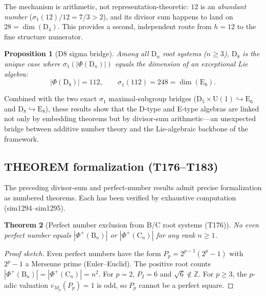 \documentclass[aps,prd,twocolumn,superscriptaddress,floatfix,nofootinbib]{revtex4-2}
\newtheorem{theorem}{Theorem}
\newtheorem{proposition}[theorem]{Proposition}
\theoremstyle{definition}
\theoremstyle{remark}
\begin{document}
\noindent
The mechanism is arithmetic, not representation-theoretic: $12$ is an
\textit{abundant number} ($\sigma_1(12)/12 = 7/3 > 2$), and its divisor
sum happens to land on $28 = \dim(\mathrm{D}_4)$.  This provides a
second, independent route from $h = 12$ to the fine structure numerator.

\begin{proposition}[D8 sigma bridge]
\label{prop:d8-sigma}
Among all $\mathrm{D}_n$ root systems ($n \geq 3$),
$\mathrm{D}_8$ is the unique case where $\sigma_1(|\Phi(\mathrm{D}_n)|)$
equals the dimension of an exceptional Lie algebra:
\begin{equation}
|\Phi(\mathrm{D}_8)| = 112, \qquad
\sigma_1(112) = 248 = \dim(\mathrm{E}_8).
\end{equation}
\end{proposition}

\noindent
Combined with the two exact $\sigma_1$ maximal-subgroup bridges
($\mathrm{D}_5 \times \mathrm{U}(1) \hookrightarrow \mathrm{E}_6$
and $\mathrm{D}_8 \hookrightarrow \mathrm{E}_8$), these results show
that the D-type and E-type algebras are linked not only by embedding
theorems but by divisor-sum arithmetic---an unexpected bridge between
additive number theory and the Lie-algebraic backbone of the framework.

\subsection{THEOREM formalization (T176--T183)}
\label{sec:theorem-formalization}

The preceding divisor-sum and perfect-number results admit precise
formalization as numbered theorems.  Each has been verified by
exhaustive computation (sim1294--sim1295).

\begin{theorem}[Perfect number exclusion from B/C root systems (T176)]
\label{thm:bc-exclusion}
No even perfect number equals $|\Phi^+(\mathrm{B}_n)|$ or
$|\Phi^+(\mathrm{C}_n)|$ for any rank $n \geq 1$.
\end{theorem}

\begin{proof}[Proof sketch]
Even perfect numbers have the form $P_p = 2^{p-1}(2^p - 1)$ with
$2^p - 1$ a Mersenne prime (Euler--Euclid).  The positive root counts
$|\Phi^+(\mathrm{B}_n)| = |\Phi^+(\mathrm{C}_n)| = n^2$.  For $p = 2$,
$P_2 = 6$ and $\sqrt{6} \notin \mathbb{Z}$.  For $p \geq 3$, the
$p$-adic valuation $v_{M_p}(P_p) = 1$ is odd, so $P_p$ cannot be a
perfect square.
\end{proof}
\end{document}
